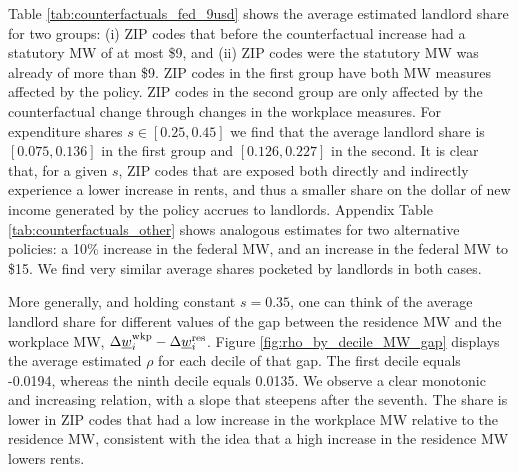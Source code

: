 Table \ref{tab:counterfactuals_fed_9usd} shows the average estimated landlord 
share for two groups: 
(i) ZIP codes that before the counterfactual increase had a statutory MW of 
at most \$9, and 
(ii) ZIP codes were the statutory MW was already of more than \$9.
ZIP codes in the first group have both MW measures affected by the policy.
ZIP codes in the second group are only affected by the counterfactual change 
through changes in the workplace measures.
For expenditure shares $s\in[0.25, 0.45]$ we find that the average landlord
share is $[0.075, 0.136]$ in the first group and $[0.126, 0.227]$ in the 
second.
It is clear that, for a given $s$, ZIP codes that are exposed both directly
and indirectly experience a lower increase in rents, and thus a smaller share
on the dollar of new income generated by the policy accrues to landlords.
Appendix Table \ref{tab:counterfactuals_other} shows analogous estimates for
two alternative policies: a 10\% increase in the federal MW, and an increase
in the federal MW to \$15.
We find very similar average shares pocketed by landlords in both cases.

More generally, and holding constant $s=0.35$, one can think of the average 
landlord share for different values of the gap between the residence MW and 
the workplace MW, $\Delta \underline{w}_i^{\text{wkp}} - \Delta \underline{w}_i^{\text{res}}$.
Figure \ref{fig:rho_by_decile_MW_gap} displays the average estimated $\rho$ for 
each decile of that gap.
The first decile equals -0.0194, whereas the ninth decile equals 0.0135.
We observe a clear monotonic and increasing relation, with a slope that 
steepens after the seventh.
The share is lower in ZIP codes that had a low increase in the workplace MW 
relative to the residence MW, consistent with the idea that a high increase 
in the residence MW lowers rents.
